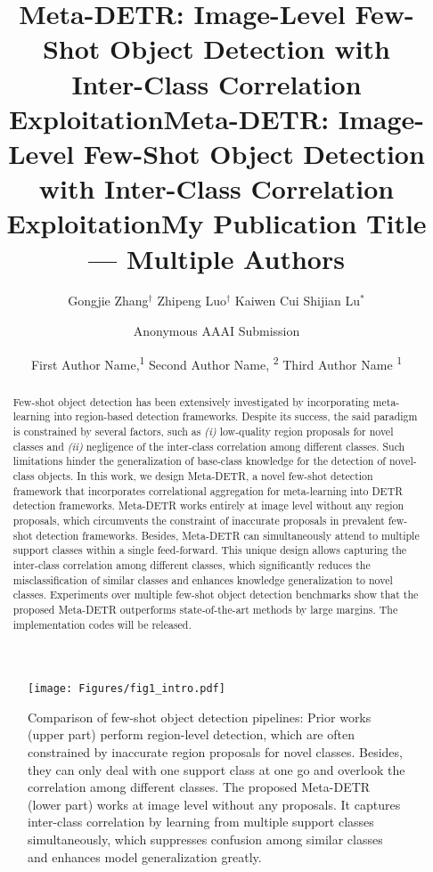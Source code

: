 \documentclass[letterpaper]{article} \usepackage{aaai22}  \usepackage{times}  \usepackage{helvet}  \usepackage{courier}  \usepackage[hyphens]{url}  \usepackage{graphicx} \urlstyle{rm} \def\UrlFont{\rm}  \usepackage{natbib}  \usepackage{caption} \DeclareCaptionStyle{ruled}{labelfont=normalfont,labelsep=colon,strut=off} \frenchspacing  \setlength{\pdfpagewidth}{8.5in}  \setlength{\pdfpageheight}{11in}  \usepackage{algorithm}
\title{Meta-DETR: Image-Level Few-Shot Object Detection with \\ Inter-Class Correlation Exploitation}
\author{
    {\fontsize{10.0}{1cm}\selectfont  Gongjie Zhang$^\dagger$ \qquad Zhipeng Luo$^\dagger$ \qquad Kaiwen Cui \qquad Shijian Lu$^*$}
}
\title{Meta-DETR: Image-Level Few-Shot Object Detection with Inter-Class Correlation Exploitation}
\author {
    Anonymous AAAI Submission
}
\title{My Publication Title --- Multiple Authors}
\author {
First Author Name,\textsuperscript{\rm 1}
    Second Author Name, \textsuperscript{\rm 2}
    Third Author Name \textsuperscript{\rm 1}
}
\begin{document}
\maketitle



\begin{abstract}

Few-shot object detection has been extensively investigated by incorporating meta-learning into region-based detection frameworks. Despite its success, the said paradigm is constrained by several factors, such as \textit{(i)} low-quality region proposals for novel classes and \textit{(ii)} negligence of the inter-class correlation among different classes. Such limitations hinder the generalization of base-class knowledge for the detection of novel-class objects. In this work, we design Meta-DETR, a novel few-shot detection framework that incorporates correlational aggregation for meta-learning into DETR detection frameworks. Meta-DETR works entirely at image level without any region proposals, which circumvents the constraint of inaccurate proposals in prevalent few-shot detection frameworks. Besides, Meta-DETR can simultaneously attend to multiple support classes within a single feed-forward. This unique design allows capturing the inter-class correlation among different classes, which significantly reduces the misclassification of similar classes and enhances knowledge generalization to novel classes. Experiments over multiple few-shot object detection benchmarks show that the proposed Meta-DETR outperforms state-of-the-art methods by large margins. The implementation codes will be released.

\end{abstract}


\begin{figure}[t!] 
\begin{center}
   \texttt{[image: Figures/fig1\_intro.pdf]}
\end{center}
\vspace*{-2.66mm}
\caption{
Comparison of few-shot object detection pipelines: Prior works (upper part) perform region-level detection, which are often constrained by inaccurate region proposals for novel classes. Besides, they can only deal with one support class at one go and overlook the correlation among different classes. The proposed Meta-DETR (lower part) works at image level without any proposals. It captures inter-class correlation by learning from multiple support classes simultaneously, which suppresses confusion among similar classes and enhances model generalization greatly.
}
\label{fig:fig1}
\vspace*{-1.5mm}
\end{figure}
\end{document}
